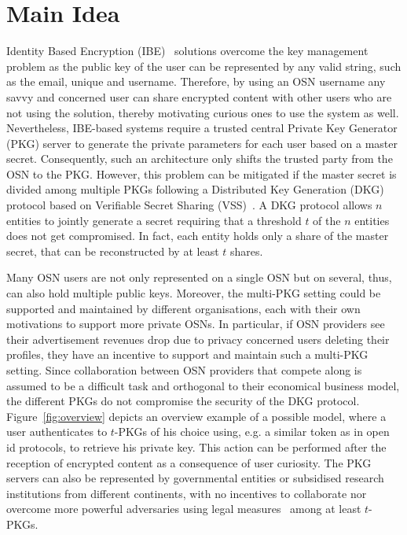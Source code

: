 \section{Main Idea}
Identity Based Encryption (IBE)~\cite{art:Shamir84} solutions overcome the key management problem as the public key of the user can be represented by any valid string, such as the email, unique \id{} and username. Therefore, by using an OSN username any savvy and concerned user can share encrypted content with other users who are not using the solution, thereby motivating curious ones to use the system as well. Nevertheless, IBE-based systems require a trusted central Private Key Generator (PKG) server to generate the private parameters for each user based on a master secret. Consequently, such an architecture only shifts the trusted party from the OSN to the PKG. However, this problem can be mitigated if the master secret is divided among multiple PKGs following a Distributed Key Generation (DKG)~\cite{art:Pedersen91a} protocol based on Verifiable Secret Sharing (VSS)~\cite{art:ChorGMA85}. A DKG protocol allows $n$ entities to jointly generate a secret requiring that a threshold $t$ of the $n$ entities does not get compromised. In fact, each entity holds only a share of the master secret, that can be reconstructed by at least $t$ shares. 

Many OSN users are not only represented on a single OSN but on several, thus, can also hold multiple public keys. Moreover, the multi-PKG setting could be supported and maintained by different organisations, each with their own motivations to support more private OSNs. In particular, if OSN providers see their advertisement revenues drop due to privacy concerned users deleting their profiles, they have an incentive to support and maintain such a multi-PKG setting. Since collaboration between OSN providers that compete along is assumed to be a difficult task and orthogonal to their economical business model, the different PKGs do not compromise the security of the DKG protocol. Figure~\ref{fig:overview} depicts an overview example of a possible model, where a user authenticates to $t$-PKGs of his choice using, e.g. a similar token as in open id protocols, to retrieve his private key. This action can be performed after the reception of encrypted content as a consequence of user curiosity. The PKG servers can also be represented by governmental entities or subsidised research institutions from different continents, with no incentives to collaborate nor overcome more powerful adversaries using legal measures~\cite{art:Matyszcyk12} among at least $t$-PKGs. 


